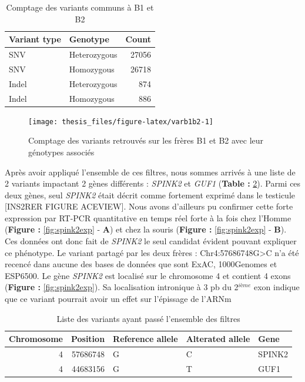 \documentclass[12pt,twoside]{reedthesis}
\theoremstyle{definition}
\theoremstyle{definition}
\theoremstyle{remark}
\begin{document}
  \begin{table}
  
  \caption{\label{tab:tabcommonvar}Comptage des variants communs à B1 et B2}
  \centering
  \begin{tabular}[t]{l|l|r}
  \hline
  Variant type & Genotype & Count\\
  \hline
  SNV & Heterozygous & 27056\\
  \hline
  SNV & Homozygous & 26718\\
  \hline
  Indel & Heterozygous & 874\\
  \hline
  Indel & Homozygous & 886\\
  \hline
  \end{tabular}
  \end{table}
  
  \begin{figure}
  
  {\centering \texttt{[image: thesis\_files/figure-latex/varb1b2-1]} 
  
  }
  
  \caption[Comptage des variants retrouvés sur les frères B1 et B2 avec leur génotypes associés]{Comptage des variants retrouvés sur les frères B1 et B2 avec leur génotypes associés}\label{fig:varb1b2}
  \end{figure}
  
  Après avoir appliqué l'ensemble de ces filtres, nous sommes arrivés à
  une liste de 2 variants impactant 2 gènes différents : \emph{SPINK2} et
  \emph{GUF1} (\textbf{Table : }\ref{tab:passingfiltervar}). Parmi ces
  deux gènes, seul \emph{SPINK2} était décrit comme fortement exprimé dans
  le testicule {[}INS2RER FIGURE ACEVIEW{]}. Nous avons d'ailleurs pu
  confirmer cette forte expression par RT-PCR quantitative en temps réel
  forte à la fois chez l'Homme (\textbf{Figure : }\ref{fig:spink2exp} -
  \textbf{A}) et chez la souris (\textbf{Figure : }\ref{fig:spink2exp} -
  \textbf{B}). Ces données ont donc fait de \emph{SPINK2} le seul candidat
  évident pouvant expliquer ce phénotype. Le variant partagé par les deux
  frères : Chr4:57686748G\textgreater{}C n'a été recencé dans aucune des
  bases de données que sont ExAC, 1000Genomes et ESP6500. Le gène
  \emph{SPINK2} est localisé sur le chromosome 4 et contient 4 exons
  (\textbf{Figure : }\ref{fig:spink2exp}). Sa localisation intronique à 3
  pb du 2\(^{ième}\) exon indique que ce variant pourrait avoir un effet
  sur l'épissage de l'ARNm
  
  \begin{table}
  
  \caption{\label{tab:passingfiltervar}Liste des variants ayant passé l'ensemble des filtres}
  \centering
  \begin{tabular}[t]{r|r|l|l|l}
  \hline
  Chromosome & Position & Reference allele & Alterated allele & Gene\\
  \hline
  4 & 57686748 & G & C & SPINK2\\
  \hline
  4 & 44683156 & G & T & GUF1\\
  \hline
  \end{tabular}
  \end{table}
  
\end{document}
